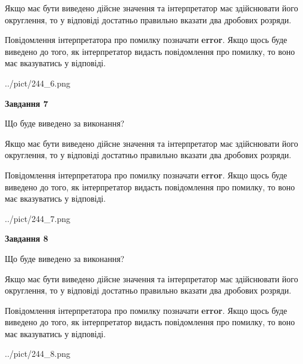 \documentclass[12pt, ukrainian]{article}
\begin{document}
{\begin {Large}
Якщо має бути виведено дійсне значення та інтерпретатор має здійснювати його округлення, 
то у відповіді достатньо правильно вказати два дробових розряди.

Повідомлення інтерпретатора про помилку позначати \textbf{error}.
Якщо щось буде виведено до того, як інтерпретатор видасть повідомлення про помилку, 
то воно має вказуватись у відповіді. \par

\begin{center}
	{../pict/244_6.png}
\end{center}
\newpage

{\begin {center}\textbf{Завдання 7}\end {center}}\par
Що буде виведено за виконання? \par

Якщо має бути виведено дійсне значення та інтерпретатор має здійснювати його округлення, 
то у відповіді достатньо правильно вказати два дробових розряди.

Повідомлення інтерпретатора про помилку позначати \textbf{error}.
Якщо щось буде виведено до того, як інтерпретатор видасть повідомлення про помилку, 
то воно має вказуватись у відповіді. \par

\begin{center}
	{../pict/244_7.png}
\end{center}
\newpage

{\begin {center}\textbf{Завдання 8}\end {center}}\par
Що буде виведено за виконання? \par

Якщо має бути виведено дійсне значення та інтерпретатор має здійснювати його округлення, 
то у відповіді достатньо правильно вказати два дробових розряди.

Повідомлення інтерпретатора про помилку позначати \textbf{error}.
Якщо щось буде виведено до того, як інтерпретатор видасть повідомлення про помилку, 
то воно має вказуватись у відповіді. \par

\begin{center}
	{../pict/244_8.png}
\end{center}
\newpage


\end{Large}}
\end{document}

